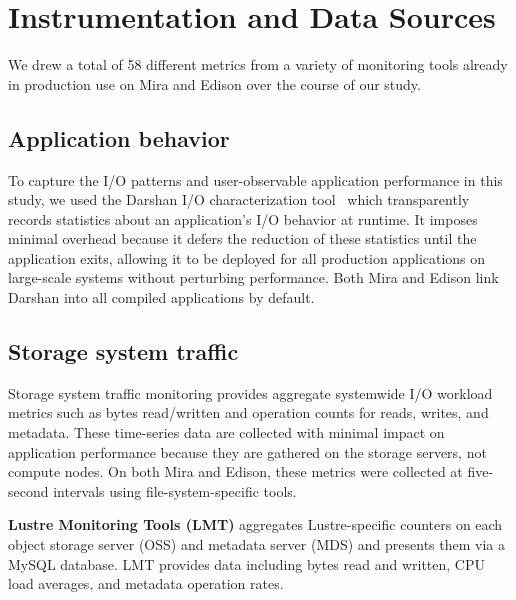 


\section{Instrumentation and Data Sources} \label{sec:methods}

We drew a total of 58 different metrics from a variety
of monitoring tools already in production use on Mira and Edison over the
course of our study.

\subsection{Application behavior} \label{sec:methods/darshan}

To capture the I/O patterns and user-observable application performance in this study, we used the Darshan I/O characterization tool~\cite{carns200924} which transparently records statistics about an application's I/O behavior at runtime.
It imposes minimal overhead because it defers the reduction of these statistics until the application exits,
allowing it to be deployed for all production applications on large-scale systems without perturbing performance.  Both Mira and Edison link Darshan into all compiled applications by default.

\subsection{Storage system traffic} \label{sec:methods/storagesystraffic}

Storage system traffic monitoring provides aggregate systemwide I/O workload metrics such as bytes read/written and operation counts for reads, writes, and metadata.
These time-series data are collected with minimal impact on application performance because they are gathered on the storage servers, not compute nodes.
On both Mira and Edison, these metrics were collected at five-second intervals using file-system-specific tools.  

\label{sec:methods/lmt}
\textbf{Lustre Monitoring Tools (LMT)} aggregates Lustre-specific counters on each object storage server (OSS) and metadata server (MDS) and presents them via a MySQL database.
LMT provides data including bytes read and written, CPU load averages, and metadata operation rates.


